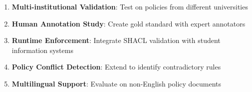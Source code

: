 \begin{enumerate}
    \item \textbf{Multi-institutional Validation}: Test on policies from different universities
    \item \textbf{Human Annotation Study}: Create gold standard with expert annotators
    \item \textbf{Runtime Enforcement}: Integrate SHACL validation with student information systems
    \item \textbf{Policy Conflict Detection}: Extend to identify contradictory rules
    \item \textbf{Multilingual Support}: Evaluate on non-English policy documents
\end{enumerate}
